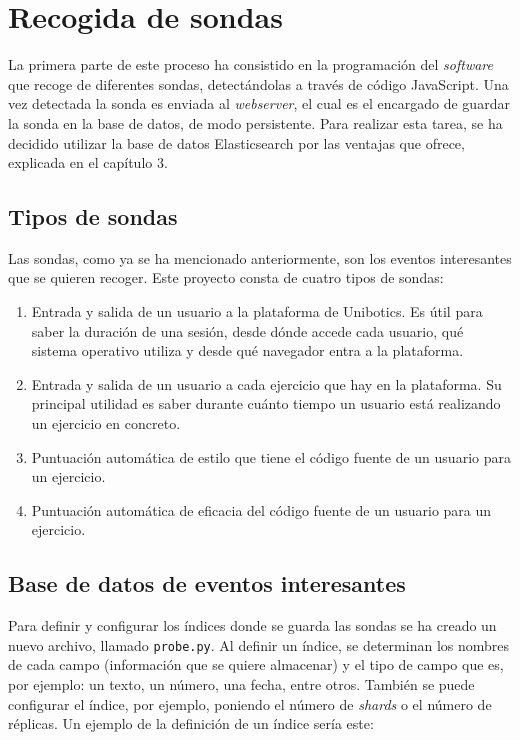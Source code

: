 \section{Recogida de sondas}
La primera parte de este proceso ha consistido en la programación del \textit{software} que recoge de diferentes sondas, detectándolas a través de código JavaScript. Una vez detectada la sonda es enviada al \textit{webserver}, el cual es el encargado de guardar la sonda en la base de datos, de modo persistente. Para realizar esta tarea, se ha decidido utilizar la base de datos Elasticsearch por las ventajas que ofrece, explicada en el capítulo 3.

\subsection{Tipos de sondas}
Las sondas, como ya se ha mencionado anteriormente, son los eventos interesantes que se quieren recoger. Este proyecto consta de cuatro tipos de sondas:
\begin{enumerate}
\item Entrada y salida de un usuario a la plataforma de Unibotics. Es útil para saber la duración de una sesión, desde dónde accede cada usuario, qué sistema operativo utiliza y desde qué navegador entra a la plataforma.
\item Entrada y salida de un usuario a cada ejercicio que hay en la plataforma. Su principal utilidad es saber durante cuánto tiempo un usuario está realizando un ejercicio en concreto.
\item Puntuación automática de estilo que tiene el código fuente de un usuario para un ejercicio.
\item Puntuación automática de eficacia del código fuente de un usuario para un ejercicio.
\end{enumerate}
\newpage
\subsection{Base de datos de eventos interesantes}
Para definir y configurar los índices donde se guarda las sondas se ha creado un nuevo archivo, llamado \texttt{probe.py}. Al definir un índice, se determinan los nombres de cada campo (información que se quiere almacenar) y el tipo de campo que es, por ejemplo: un texto, un número, una fecha, entre otros. También se puede configurar el índice, por ejemplo, poniendo el número de\textit{ shards }o el número de réplicas. Un ejemplo de la definición de un índice sería este: \\

